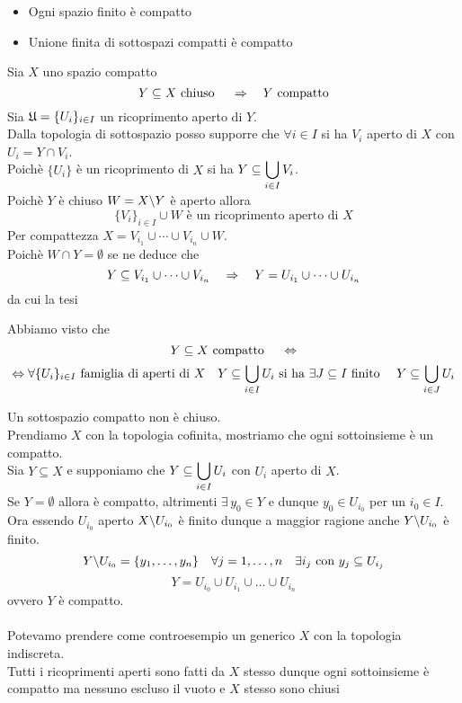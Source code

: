 \spazio
\begin{fatti}\bbianco
\begin{itemize}
\item Ogni spazio finito \`e compatto 
\item Unione finita di sottospazi compatti \`e compatto
\end{itemize}
\end{fatti}
\spazio
\begin{thm}\label{chiuso_in_compatto}Sia $X$ uno spazio compatto
$$ Y \subseteq X \text{ chiuso } \quad \Rightarrow \quad Y \text{ compatto}$$
\proof Sia $\displaystyle \mathfrak{U}=\{ U_i \}_{i \in I} $ un ricoprimento aperto di $Y$.\\
Dalla topologia di sottospazio posso supporre che $\forall i \in I $ si ha $V_i$ aperto di $X$ con $U_i = Y \cap V_i$.\\
Poich\`e $\{ U_i\}$ \`e un ricoprimento di $X$ si ha $\displaystyle Y \subseteq \bigcup_{i \in I } V_i$.\\
Poich\`e $Y$ \`e chiuso $W=X\backslash Y$ \`e aperto allora
$$ \{ V_i \}_{i \in I} \cup W \text{ \`e un ricoprimento aperto di } X $$
Per compattezza $X=V_{i_1} \cup \cdots \cup V_{i_n} \cup W$.\\
Poich\`e $W \cap Y = \emptyset$ se ne deduce che 
$$ Y \subseteq V_{i_1}\cup \cdots \cup V_{i_n} \quad \Rightarrow \quad Y= U_{i_1} \cup \cdots \cup U_{i_n}$$
da cui la tesi \endproof
\end{thm}
\begin{oss}
Abbiamo visto che $$Y \subseteq X \text{  compatto } \quad \Leftrightarrow $$
$$\Leftrightarrow \forall \{ U_i\}_{i \in I } \text{ famiglia di aperti di } X \quad  Y \subseteq \bigcup_{i\in I } U_i \text{ si ha }  \exists J\subseteq I \text{ finito } \quad Y \subseteq \bigcup_{i \in J } U_i$$
\end{oss}
\spazio
\begin{oss}Un sottospazio compatto non \`e chiuso.\\
Prendiamo $X$ con la topologia cofinita, mostriamo che ogni sottoinsieme \`e un compatto.\\
Sia $Y \subseteq X $ e supponiamo che $ \displaystyle Y \subseteq \bigcup_{i \in I } U_i$ con $U_i $ aperto di $X$.\\
Se $Y = \emptyset$ allora \`e compatto, altrimenti $\exists\, y_0 \in Y$ e  dunque $y_0 \in U_{i_0}$ per un $i_0 \in I$.\\
Ora essendo $U_{i_0}$ aperto $X\backslash U_{i_0}$ \`e finito dunque a maggior ragione anche $Y \backslash U_{i_0}$ \`e finito.
$$ Y \backslash  U_{i_0} =\{ y_1, \dots, y_n\} \quad \forall j=1,\dots,n \quad \exists i_j \text{ con } y_j \subseteq U_{i_j}$$
$$ Y = U_{i_0} \cup U_{i_1} \cup \dots  \cup U_{i_n}$$
ovvero $Y$ \`e compatto.\\
\\
Potevamo prendere come controesempio un generico $X$ con la topologia indiscreta.\\
Tutti i ricoprimenti aperti sono fatti da $X$ stesso dunque ogni sottoinsieme \`e compatto ma nessuno escluso il vuoto e $X$ stesso sono chiusi
\end{oss}
\spazio

